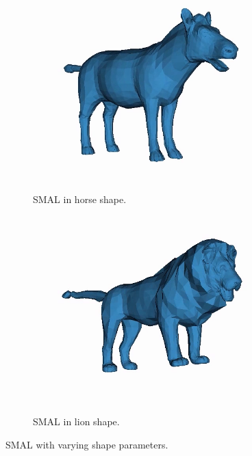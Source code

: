 \begin{figure}[H]
\begin{subfigure}{0.3\linewidth}
                \includegraphics[width=1\linewidth]{smal/horse}
                \caption{SMAL in horse shape.}
            \end{subfigure}%
            \begin{subfigure}{0.3\linewidth}
                \centering
                    \includegraphics[width=1\linewidth]{smal/lion}
                    \caption{SMAL in lion shape.}
            \end{subfigure}%
            \caption{SMAL with varying shape parameters.}
            \label{fig:smal_model_shape}
            \end{figure}
    
